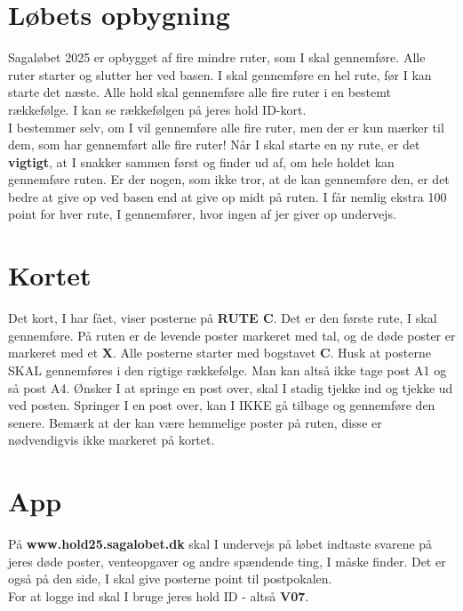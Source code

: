 \section{Løbets opbygning}
Sagaløbet 2025 er opbygget af fire mindre ruter, som I skal gennemføre. Alle ruter starter og slutter her ved basen. I skal gennemføre en hel rute, før I kan starte det næste. Alle hold skal gennemføre alle fire ruter i en bestemt rækkefølge. I kan se rækkefølgen på jeres hold ID-kort.\\\newline
I bestemmer selv, om I vil gennemføre alle fire ruter, men der er kun mærker til dem, som har gennemført alle fire ruter! Når I skal starte en ny rute, er det \textbf{vigtigt}, at I snakker sammen først og finder ud af, om hele holdet kan gennemføre ruten. Er der nogen, som ikke tror, at de kan gennemføre den, er det bedre at give op ved basen end at give op midt på ruten. I får nemlig ekstra 100 point for hver rute, I gennemfører, hvor ingen af jer giver op undervejs.\\
\section{Kortet}
Det kort, I har fået, viser posterne på \textbf{RUTE C}. Det er den første rute, I skal gennemføre. På ruten er de levende poster markeret med tal, og de døde poster er markeret med et \textbf{X}. Alle posterne starter med bogstavet \textbf{C}. Husk at posterne SKAL gennemføres i den rigtige rækkefølge. Man kan altså ikke tage post A1 og så post A4. Ønsker I at springe en post over, skal I stadig tjekke ind og tjekke ud ved posten. Springer I en post over, kan I IKKE gå tilbage og gennemføre den senere. Bemærk at der kan være hemmelige poster på ruten, disse er nødvendigvis ikke markeret på kortet.
\section{App}
På \textbf{www.hold25.sagalobet.dk} skal I undervejs på løbet indtaste svarene på jeres døde poster, venteopgaver og andre spændende ting, I måske finder. Det er også på den side, I skal give posterne point til postpokalen.\\
For at logge ind skal I bruge jeres hold ID - altså \textbf{V07}.
\newpage
